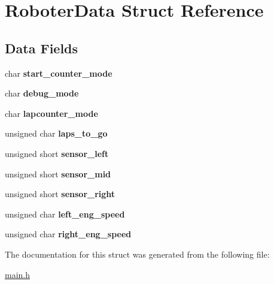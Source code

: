 \hypertarget{structRoboterData}{}\section{Roboter\+Data Struct Reference}
\label{structRoboterData}
\subsection*{Data Fields}
\begin{DoxyCompactItemize}
\item 
\mbox{\label{structRoboterData_a6f099c13b46eab50678aec438cc53ca3}} 
char {\bfseries start\+\_\+counter\+\_\+mode}
\item 
\mbox{\label{structRoboterData_ace2f158d5f68533ef246dd213a29bd9f}} 
char {\bfseries debug\+\_\+mode}
\item 
\mbox{\label{structRoboterData_a6430a29ef767a960096d41388d0bf4fe}} 
char {\bfseries lapcounter\+\_\+mode}
\item 
\mbox{\label{structRoboterData_acd766b4055de6019017cd677dd6d50e7}} 
unsigned char {\bfseries laps\+\_\+to\+\_\+go}
\item 
\mbox{\label{structRoboterData_a9545c958467511381caa09f9735d75ae}} 
unsigned short {\bfseries sensor\+\_\+left}
\item 
\mbox{\label{structRoboterData_a6cf40606f9d548200547cac093ed2757}} 
unsigned short {\bfseries sensor\+\_\+mid}
\item 
\mbox{\label{structRoboterData_a020fa812afb0119b21c9e242ce47fd79}} 
unsigned short {\bfseries sensor\+\_\+right}
\item 
\mbox{\label{structRoboterData_a36c0359086a8902cbbc7da8e56f2c35f}} 
unsigned char {\bfseries left\+\_\+eng\+\_\+speed}
\item 
\mbox{\label{structRoboterData_aafcb7569d083d3417ab734aa787fff79}} 
unsigned char {\bfseries right\+\_\+eng\+\_\+speed}
\end{DoxyCompactItemize}


The documentation for this struct was generated from the following file\+:\begin{DoxyCompactItemize}
\item 
\hyperlink{main_8h}{main.\+h}\end{DoxyCompactItemize}
